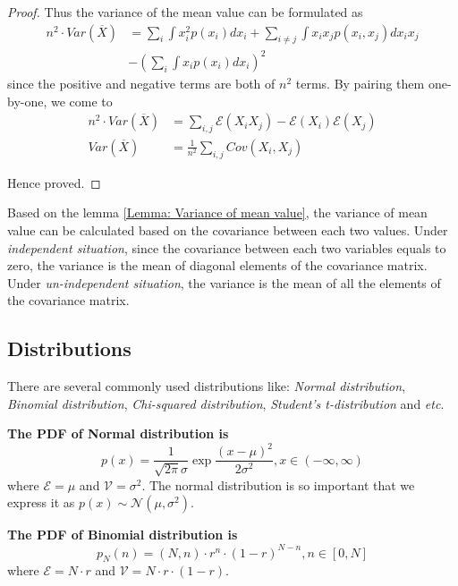 \documentclass[../main.tex]{subfiles}
\begin{document}
\begin{lemma}
\begin{proof}
        Thus the variance of the mean value can be formulated as
        \begin{align*}
            n^2 \cdot Var(\overline{X}) & = \sum_i \int x_i^2 p(x_i) dx_i + \sum_{i \neq j} \int x_i x_j p(x_i, x_j) dx_i x_j \\
                                        & - (\sum_i \int x_i p(x_i) dx_i)^2
        \end{align*}
        since the positive and negative terms are both of $n^2$ terms.
        By pairing them one-by-one, we come to
        \begin{align*}
            n^2 \cdot Var(\overline{X}) & = \sum_{i, j} \mathcal{E}(X_i X_j) - \mathcal{E}(X_i)\mathcal{E}(X_j) \\
            Var(\overline{X})           & = \frac{1}{n^2} \sum_{i, j} Cov(X_i, X_j)
        \end{align*}

        Hence proved.
    \end{proof}

\end{lemma}

Based on the lemma \ref{Lemma: Variance of mean value}, the variance of mean value can be calculated based on the covariance between each two values.
Under \emph{independent situation}, since the covariance between each two variables equals to zero, the variance is the mean of diagonal elements of the covariance matrix.
Under \emph{un-independent situation}, the variance is the mean of all the elements of the covariance matrix.

\subsection{Distributions}
There are several commonly used distributions like: \emph{Normal distribution}, \emph{Binomial distribution}, \emph{Chi-squared distribution}, \emph{Student's t-distribution} and \textit{etc}.

\bigbreak
\textbf{The PDF of Normal distribution is}
\begin{equation}
    \label{Definition: PDF of Normal distribution}
    p(x)=
    \frac{1}{\sqrt{2\pi}\sigma} \exp{\frac{(x-\mu)^2}{2\sigma^2}},
    x \in (-\infty, \infty)
\end{equation}
where $\mathcal{E}=\mu$ and $\mathcal{V}=\sigma^2$.
The normal distribution is so important that we express it as $p(x) \sim \mathcal{N}(\mu, \sigma^2)$.

\bigbreak
\textbf{The PDF of Binomial distribution is}
\begin{equation}
    \label{Definition: PDF of Binomial distribution}
    p_N(n)=
    (N, n) \cdot r^n \cdot (1-r)^{N-n},
    n \in [0, N]
\end{equation}
where $\mathcal{E}=N \cdot r$ and $\mathcal{V}=N \cdot r \cdot (1-r)$.
\end{document}
